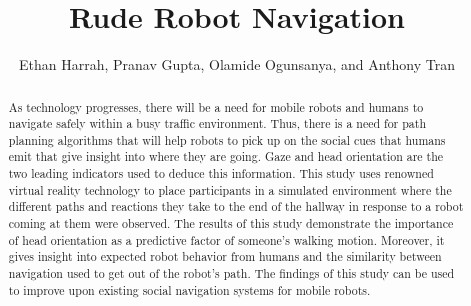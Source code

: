 \documentclass[letterpaper, 10 pt, conference]{ieeeconf}
\title{\LARGE \bf
Rude Robot Navigation
}
\author{Ethan Harrah, Pranav Gupta, Olamide Ogunsanya, and Anthony Tran%
}
\begin{document}
\maketitle
\thispagestyle{empty}
\pagestyle{empty}


\begin{abstract}
As technology progresses, there will be a need for mobile robots and humans to navigate safely within a busy traffic environment. Thus, there is a need for path planning algorithms that will help robots to pick up on the social cues that humans emit that give insight into where they are going. Gaze and head orientation are the two leading indicators used to deduce this information. This study uses renowned virtual reality technology to place participants in a simulated environment where the different paths and reactions they take to the end of the hallway in response to a robot coming at them were observed. The results of this study demonstrate the importance of head orientation as a predictive factor of someone's walking motion. Moreover, it gives insight into expected robot behavior from humans and the similarity between navigation used to get out of the robot's path. The findings of this study can be used to improve upon existing social navigation systems for mobile robots.
\end{abstract}


\end{document}
